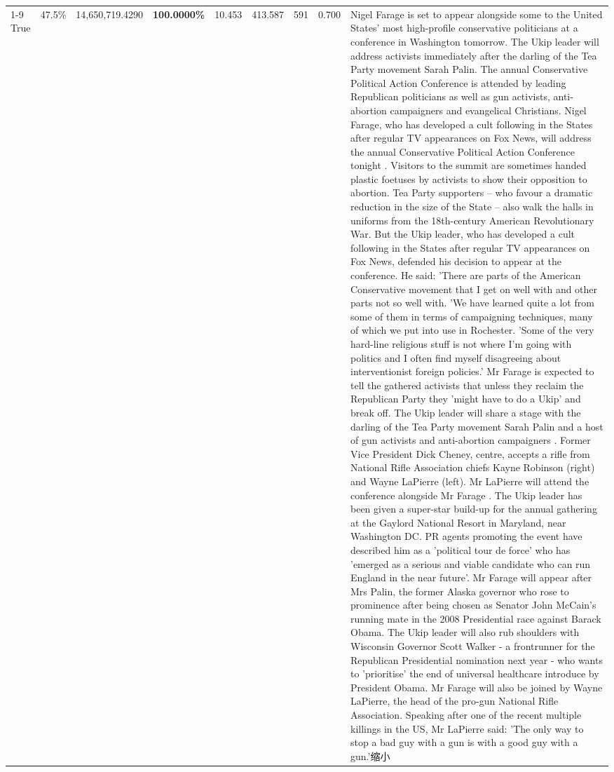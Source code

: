 \begin{table}[H]
\begin{tabular}{lllrlllll}
\cline{1-9}
True & 47.5\% & 14,650,719.4290 & \bfseries \color{red} 100.0000\% & 10.453 & 413.587 & 591 & 0.700 & Nigel Farage is set to appear alongside some to the United States' most high-profile conservative politicians at a conference in Washington tomorrow. The Ukip leader will address activists immediately after the darling of the Tea Party movement Sarah Palin. The annual Conservative Political Action Conference is attended by leading Republican politicians as well as gun activists, anti-abortion campaigners and evangelical Christians. Nigel Farage, who has developed a cult following in the States after regular TV appearances on Fox News, will address the annual Conservative Political Action Conference tonight . Visitors to the summit are sometimes handed plastic foetuses by activists to show their opposition to abortion. Tea Party supporters – who favour a dramatic reduction in the size of the State – also walk the halls in uniforms from the 18th-century American Revolutionary War. But the Ukip leader, who has developed a cult following in the States after regular TV appearances on Fox News, defended his decision to appear at the conference. He said: 'There are parts of the American Conservative movement that I get on well with and other parts not so well with. 'We have learned quite a lot from some of them in terms of campaigning techniques, many of which we put into use in Rochester. 'Some of the very hard-line religious stuff is not where I'm going with politics and I often find myself disagreeing about interventionist foreign policies.' Mr Farage is expected to tell the gathered activists that unless they reclaim the Republican Party they 'might have to do a Ukip' and break off. The Ukip leader will share a stage with the darling of the Tea Party movement Sarah Palin and a host of gun activists and anti-abortion campaigners . Former Vice President Dick Cheney, centre, accepts a rifle from National Rifle Association chiefs Kayne Robinson (right) and Wayne LaPierre (left). Mr LaPierre will attend the conference alongside Mr Farage . The Ukip leader has been given a super-star build-up for the annual gathering at the Gaylord National Resort in Maryland, near Washington DC. PR agents promoting the event have described him as a 'political tour de force' who has 'emerged as a serious and viable candidate who can run England in the near future'. Mr Farage will appear after Mrs Palin, the former Alaska governor who rose to prominence after being chosen as Senator John McCain's running mate in the 2008 Presidential race against Barack Obama. The Ukip leader will also rub shoulders with Wisconsin Governor Scott Walker - a frontrunner for the Republican Presidential nomination next year - who wants to 'prioritise' the end of universal healthcare introduce by President Obama. Mr Farage will also be joined by Wayne LaPierre, the head of the pro-gun National Rifle Association. Speaking after one of the recent multiple killings in the US, Mr LaPierre said: 'The only way to stop a bad guy with a gun is with a good guy with a gun.'缩小 \\

\end{tabular}
\end{table}
